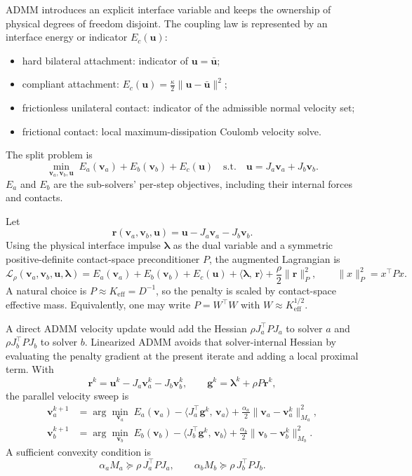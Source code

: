 \documentclass[11pt]{article}
\newcommand{\va}{\bm v_a}
\newcommand{\vb}{\bm v_b}
\newcommand{\uu}{\bm u}
\newcommand{\ubar}{\bar{\bm u}}
\newcommand{\lam}{\bm\lambda}
\newcommand{\Ja}{J_a}
\newcommand{\Jb}{J_b}
\newcommand{\Ma}{M_a}
\newcommand{\Mb}{M_b}
\newcommand{\Dop}{D}
\newcommand{\Keff}{K_{\mathrm{eff}}}
\newcommand{\Pmat}{P}
\newcommand{\res}{\bm r}
\begin{document}
ADMM introduces an explicit interface variable and keeps the ownership of physical
degrees of freedom disjoint. The coupling law is represented by an interface energy or
indicator $E_c(\uu)$:
\begin{itemize}
\item hard bilateral attachment: indicator of $\uu=\ubar$;
\item compliant attachment: $E_c(\uu)=\frac{\kappa}{2}\|\uu-\ubar\|^2$;
\item frictionless unilateral contact: indicator of the admissible normal velocity set;
\item frictional contact: local maximum-dissipation Coulomb velocity solve.
\end{itemize}
The split problem is
\begin{equation}
\min_{\va,\vb,\uu}\;
    E_a(\va) + E_b(\vb) + E_c(\uu)
\quad\text{s.t.}\quad
    \uu = \Ja\va + \Jb\vb .
\label{eq:admm-split}
\end{equation}
$E_a$ and $E_b$ are the sub-solvers' per-step objectives, including their internal
forces and contacts.

Let
\[
    \res(\va,\vb,\uu)=\uu-\Ja\va-\Jb\vb .
\]
Using the physical interface impulse $\lam$ as the dual variable and a symmetric
positive-definite contact-space preconditioner $\Pmat$, the augmented Lagrangian is
\begin{equation}
\mathcal L_\rho(\va,\vb,\uu,\lam)
=
E_a(\va)+E_b(\vb)+E_c(\uu)
+ \langle \lam,\,\res\rangle
+ \frac{\rho}{2}\|\res\|_{\Pmat}^2,
\qquad
\|x\|_{\Pmat}^2 = x^\top\Pmat x.
\label{eq:alag}
\end{equation}
A natural choice is $\Pmat\approx\Keff=\Dop^{-1}$, so the penalty is scaled by
contact-space effective mass. Equivalently, one may write
$\Pmat=W^\top W$ with $W\approx\Keff^{1/2}$.

A direct ADMM velocity update would add the Hessian
$\rho\Ja^\top\Pmat\Ja$ to solver $a$ and $\rho\Jb^\top\Pmat\Jb$ to solver $b$.
Linearized ADMM avoids that solver-internal Hessian by evaluating the penalty gradient
at the present iterate and adding a local proximal term. With
\[
    \res^k = \uu^k-\Ja\va^k-\Jb\vb^k,\qquad
    \bm g^k = \lam^k + \rho\Pmat\res^k ,
\]
the parallel velocity sweep is
\begin{align}
\va^{k+1}
&= \arg\min_{\va}\;
    E_a(\va)
    - \langle \Ja^\top\bm g^k,\,\va\rangle
    + \frac{\alpha_a}{2}\|\va-\va^k\|_{\Ma}^2,
    \label{eq:admm-va}\\
\vb^{k+1}
&= \arg\min_{\vb}\;
    E_b(\vb)
    - \langle \Jb^\top\bm g^k,\,\vb\rangle
    + \frac{\alpha_b}{2}\|\vb-\vb^k\|_{\Mb}^2.
    \label{eq:admm-vb}
\end{align}
A sufficient convexity condition is
\[
    \alpha_a\Ma \succeq \rho\,\Ja^\top\Pmat\Ja,\qquad
    \alpha_b\Mb \succeq \rho\,\Jb^\top\Pmat\Jb .
\]
\end{document}
